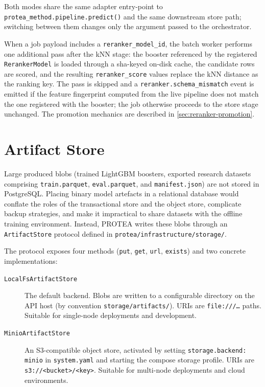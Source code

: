 Both modes share the same adapter entry-point to
\texttt{protea\_method.pipeline.predict()} and the same downstream store
path; switching between them changes only the argument passed to the
orchestrator.

When a job payload includes a \texttt{reranker\_model\_id}, the batch worker
performs one additional pass after the kNN stage: the booster referenced by
the registered \texttt{RerankerModel} is loaded through a sha-keyed on-disk
cache, the candidate rows are scored, and the resulting \texttt{reranker\_score}
values replace the kNN distance as the ranking key. The pass is skipped and a
\texttt{reranker.schema\_mismatch} event is emitted if the feature fingerprint
computed from the live pipeline does not match the one registered with the
booster; the job otherwise proceeds to the store stage unchanged. The
promotion mechanics are described in \cref{sec:reranker-promotion}.

\section{Artifact Store}
\label{sec:artifact-store}

Large produced blobs (trained LightGBM boosters, exported research datasets
comprising \texttt{train.parquet}, \texttt{eval.parquet}, and
\texttt{manifest.json}) are not stored in PostgreSQL. Placing binary model
artefacts in a relational database would conflate the roles of the transactional
store and the object store, complicate backup strategies, and make it
impractical to share datasets with the offline training environment. Instead,
PROTEA writes these blobs through an \texttt{ArtifactStore} protocol defined in
\texttt{protea/infrastructure/storage/}.

The protocol exposes four methods (\texttt{put}, \texttt{get}, \texttt{url},
\texttt{exists}) and two concrete implementations:

\begin{description}
  \item[\texttt{LocalFsArtifactStore}] The default backend. Blobs are written to
    a configurable directory on the API host (by convention
    \texttt{storage/artifacts/}). URIs are \texttt{file:///\ldots} paths.
    Suitable for single-node deployments and development.
  \item[\texttt{MinioArtifactStore}] An S3-compatible object store, activated
    by setting \texttt{storage.backend: minio} in \texttt{system.yaml} and
    starting the compose storage profile. URIs are \texttt{s3://<bucket>/<key>}.
    Suitable for multi-node deployments and cloud environments.
\end{description}

